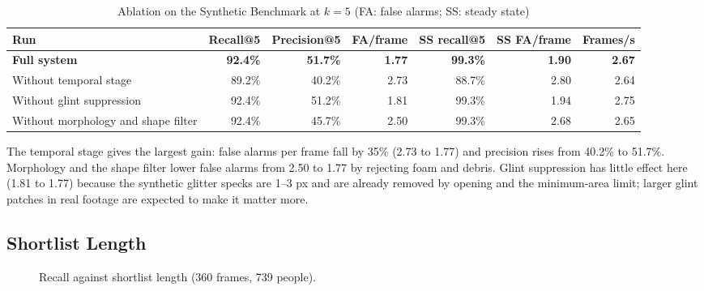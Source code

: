 \documentclass[conference,a4paper]{IEEEtran}
\begin{document}
\begin{table}[!t]
\centering
\footnotesize
\caption{Ablation on the Synthetic Benchmark at $k = 5$ (FA: false alarms; SS: steady state)}
\label{tab:ablation}
\begin{tabular}{@{}lrrrrrr@{}}
\toprule
Run & Recall@5 & Precision@5 & FA/frame & SS recall@5 & SS FA/frame & Frames/s \\
\midrule
\textbf{Full system} & \textbf{92.4\%} & \textbf{51.7\%} & \textbf{1.77} & \textbf{99.3\%} & \textbf{1.90} & \textbf{2.67} \\
Without temporal stage & 89.2\% & 40.2\% & 2.73 & 88.7\% & 2.80 & 2.64 \\
Without glint suppression & 92.4\% & 51.2\% & 1.81 & 99.3\% & 1.94 & 2.75 \\
Without morphology and shape filter & 92.4\% & 45.7\% & 2.50 & 99.3\% & 2.68 & 2.65 \\
\bottomrule
\end{tabular}
\end{table}

The temporal stage gives the largest gain: false alarms per frame fall by 35\% (2.73 to 1.77) and precision rises from 40.2\% to 51.7\%. Morphology and the shape filter lower false alarms from 2.50 to 1.77 by rejecting foam and debris. Glint suppression has little effect here (1.81 to 1.77) because the synthetic glitter specks are 1--3 px and are already removed by opening and the minimum-area limit; larger glint patches in real footage are expected to make it matter more.

\subsection{Shortlist Length}

\begin{figure}[!t]
\centering
{}
\caption{Recall against shortlist length (360 frames, 739 people).}
\label{fig:recall}
\end{figure}
\end{document}
